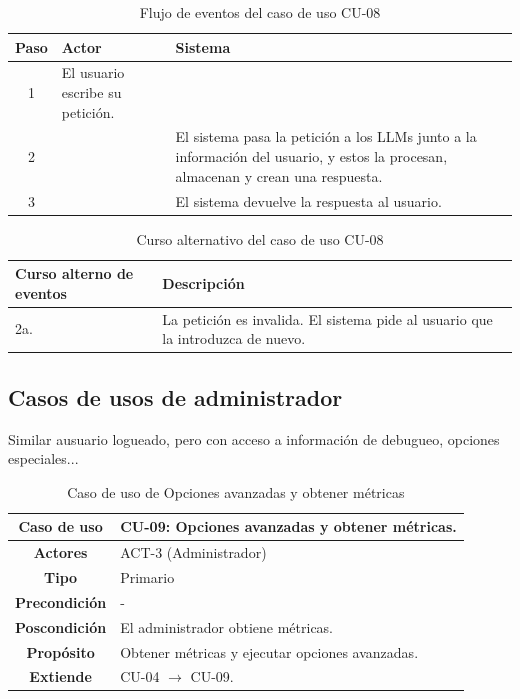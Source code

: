 \begin{table}[H]
\centering
\begin{tabular}{|c|p{5cm}|p{5cm}|}
\hline
\rowcolor{green!40} \textbf{Paso} & \textbf{Actor} & \textbf{Sistema} \\ \hline
\rowcolor{blue!10} 1 & El usuario escribe su petición. &  \\ \hline
\rowcolor{blue!10} 2 &  & El sistema pasa la petición a los LLMs junto a la información del usuario, y estos la procesan, almacenan y crean una respuesta. \\ \hline
\rowcolor{blue!10} 3 &  & El sistema devuelve la respuesta al usuario. \\ \hline
\end{tabular}
\caption{Flujo de eventos del caso de uso CU-08}
\end{table}

\begin{table}[H]
\centering
\begin{tabular}{|p{4cm}|p{8cm}|}
\hline
\rowcolor{green!40} \textbf{Curso alterno de eventos} & \textbf{Descripción} \\ \hline
\rowcolor{blue!10} 2a. & La petición es invalida. El sistema pide  al usuario que la introduzca de nuevo.\\ \hline
\end{tabular}
\caption{Curso alternativo del caso de uso CU-08}
\end{table}
\newpage
\subsection{Casos de usos de administrador}

Similar ausuario logueado, pero con acceso a información de debugueo, opciones especiales...

\begin{table}[H]
\centering
\begin{tabular}{|c|p{10cm}|}
\hline
\rowcolor{green!40} \textbf{Caso de uso} & CU-09: Opciones avanzadas y obtener métricas. \\ \hline
\rowcolor{blue!10} \textbf{Actores} & ACT-3 (Administrador) \\ \hline
\rowcolor{blue!10} \textbf{Tipo} & Primario \\ \hline
\rowcolor{blue!10} \textbf{Precondición} & - \\ \hline
\rowcolor{blue!10} \textbf{Poscondición} & El administrador obtiene métricas. \\ \hline
\rowcolor{blue!10} \textbf{Propósito} & Obtener métricas y ejecutar opciones avanzadas. \\ \hline
\rowcolor{blue!10} \textbf{Extiende} & CU-04 $\rightarrow$ CU-09.\\ \hline
\end{tabular}
\caption{Caso de uso de Opciones avanzadas y obtener métricas}
\end{table}

